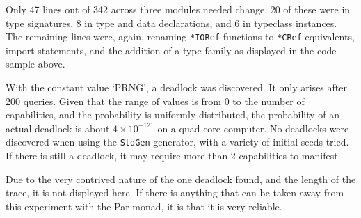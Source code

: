 Only 47 lines out of 342 across three modules needed change. 20 of
these were in type signatures, 8 in type and data declarations, and 6
in typeclass instances. The remaining lines were, again, renaming
\verb|*IORef| functions to \verb|*CRef| equivalents, import
statements, and the addition of a type family as displayed in the code
sample above.

With the constant value `PRNG', a deadlock was discovered. It only
arises after 200 queries. Given that the range of values is from 0 to
the number of capabilities, and the probability is uniformly
distributed, the probability of an actual deadlock is about $4 \times
10^{-121}$ on a quad-core computer. No deadlocks were discovered when
using the \verb|StdGen| generator, with a variety of initial seeds
tried. If there is still a deadlock, it may require more than 2
capabilities to manifest.

Due to the very contrived nature of the one deadlock found, and the
length of the trace, it is not displayed here. If there is anything
that can be taken away from this experiment with the Par monad, it is
that it is very reliable.

